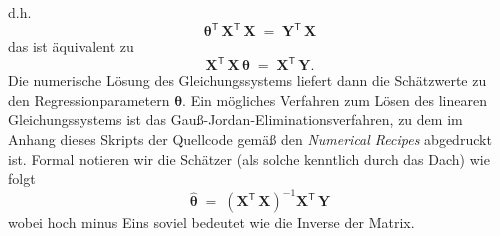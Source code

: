 d.h.
\begin{equation}
\boldsymbol{\theta}^\mathsf{T} \, \mathbf{X}^\mathsf{T}  \, \mathbf{X} \; = \;
\mathbf{Y}^\mathsf{T} \, \mathbf{X}
\end{equation}
das ist äquivalent zu
\begin{equation}
\mathbf{X}^\mathsf{T} \, \mathbf{X} \, \boldsymbol{\theta} \; = \;
\mathbf{X}^\mathsf{T} \, \mathbf{Y} .
\end{equation}
Die numerische Lösung des Gleichungssystems liefert dann die Schätzwerte zu
den Regressionparametern $\boldsymbol{\theta}$. Ein mögliches Verfahren zum
Lösen des linearen Gleichungssystems ist das Gauß-Jordan-Eliminationsverfahren, zu
dem im Anhang dieses Skripts der Quellcode gemäß den \textsl{Numerical Recipes}
\cite{Fla02} abgedruckt ist.
Formal notieren wir 
die Schätzer (als solche kenntlich durch das Dach) wie folgt
\begin{equation}
\boldsymbol{\hat \theta} \; = \;
\left( \mathbf{X}^\mathsf{T}  \, \mathbf{X} \right)^{-1} \mathbf{X}^\mathsf{T} \, \mathbf{Y}
\end{equation}
wobei hoch minus Eins soviel bedeutet wie die Inverse der Matrix.

